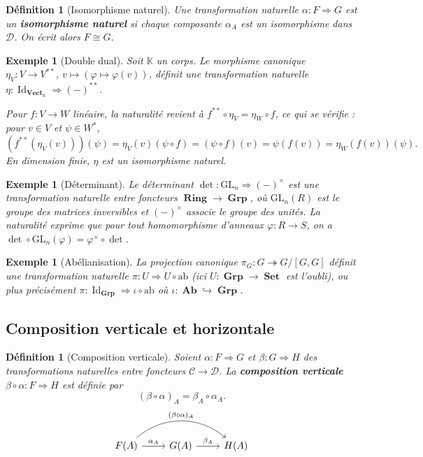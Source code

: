 \documentclass[a4paper,12pt]{book}
\DeclareMathOperator{\Id}{Id}
\DeclareMathOperator{\Set}{\mathbf{Set}}
\DeclareMathOperator{\Grp}{\mathbf{Grp}}
\DeclareMathOperator{\Ab}{\mathbf{Ab}}
\DeclareMathOperator{\Ring}{\mathbf{Ring}}
\DeclareMathOperator{\Vect}{\mathbf{Vect}}
\newcommand{\K}{\mathbb{K}}
\newtheorem{definition}[theoreme]{Définition}
\newtheorem{exemple}[theoreme]{Exemple}
\begin{document}
\begin{definition}[Isomorphisme naturel]\label{def:iso-nat}
Une transformation naturelle $\alpha : F \Rightarrow G$ est un \textbf{isomorphisme naturel} si chaque composante $\alpha_A$ est un isomorphisme dans $\mathcal{D}$. On écrit alors $F \cong G$.
\end{definition}

\begin{exemple}[Double dual]\label{ex:double-dual}
Soit $\K$ un corps. Le morphisme canonique $\eta_V : V \to V^{**}$, $v \mapsto (\varphi \mapsto \varphi(v))$, définit une transformation naturelle $\eta : \Id_{\Vect_\K} \Rightarrow (-)^{**}$.

Pour $f : V \to W$ linéaire, la naturalité revient à $f^{**} \circ \eta_V = \eta_W \circ f$, ce qui se vérifie : pour $v \in V$ et $\psi \in W^*$,
\[
  (f^{**}(\eta_V(v)))(\psi) = \eta_V(v)(\psi \circ f) = (\psi \circ f)(v) = \psi(f(v)) = \eta_W(f(v))(\psi).
\]
En dimension finie, $\eta$ est un isomorphisme naturel.
\end{exemple}

\begin{exemple}[Déterminant]\label{ex:determinant-nat}
Le déterminant $\det : \mathrm{GL}_n \Rightarrow (-)^\times$ est une transformation naturelle entre foncteurs $\Ring \to \Grp$, où $\mathrm{GL}_n(R)$ est le groupe des matrices inversibles et $(-)^\times$ associe le groupe des unités. La naturalité exprime que pour tout homomorphisme d'anneaux $\varphi : R \to S$, on a $\det \circ \mathrm{GL}_n(\varphi) = \varphi^\times \circ \det$.
\end{exemple}

\begin{exemple}[Abélianisation]\label{ex:abel-nat}
La projection canonique $\pi_G : G \twoheadrightarrow G/[G,G]$ définit une transformation naturelle $\pi : U \Rightarrow U \circ \mathrm{ab}$ (ici $U : \Grp \to \Set$ est l'oubli), ou plus précisément $\pi : \Id_{\Grp} \Rightarrow \iota \circ \mathrm{ab}$ où $\iota : \Ab \hookrightarrow \Grp$.
\end{exemple}

\subsection{Composition verticale et horizontale}

\begin{definition}[Composition verticale]\label{def:comp-verticale}
Soient $\alpha : F \Rightarrow G$ et $\beta : G \Rightarrow H$ des transformations naturelles entre foncteurs $\mathcal{C} \to \mathcal{D}$. La \textbf{composition verticale} $\beta \circ \alpha : F \Rightarrow H$ est définie par
\[
  (\beta \circ \alpha)_A = \beta_A \circ \alpha_A.
\]
\[
\begin{tikzcd}
  F(A) \arrow[r, "\alpha_A"] \arrow[rr, bend left=40, "(\beta\circ\alpha)_A"] & G(A) \arrow[r, "\beta_A"] & H(A)
\end{tikzcd}
\]
\end{definition}
\end{document}
